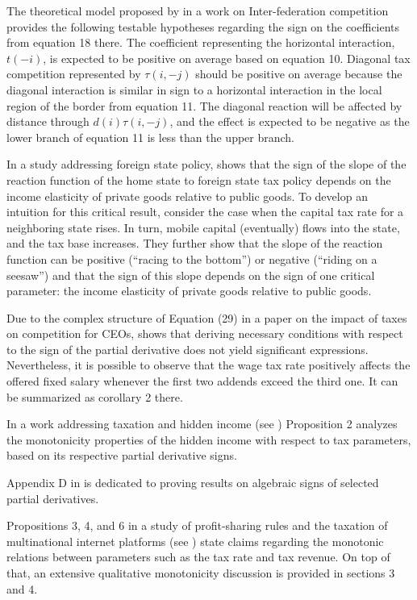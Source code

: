 \documentclass[11pt]{book}
\begin{document}
The theoretical model proposed by \cite{agrawal2015inter} in a work on Inter-federation competition provides the following
testable hypotheses regarding the sign on the coefficients from equation
18 there. The coefficient representing the horizontal interaction,
$t\left(-i\right)$, is expected to be positive on average based on
equation 10. Diagonal tax competition represented by $\tau\left(i,-j\right)$
should be positive on average because the diagonal interaction is
similar in sign to a horizontal interaction in the local region of
the border from equation 11. The diagonal reaction will be affected
by distance through $d\left(i\right)\tau\left(i,-j\right)$, and the
effect is expected to be negative as the lower branch of equation
11 is less than the upper branch.

In a study addressing foreign state policy, \cite{chirinko2017tax} shows that the sign of the slope of the reaction
function of the home state to foreign state tax policy depends on
the income elasticity of private goods relative to public goods. To
develop an intuition for this critical result, consider the case when
the capital tax rate for a neighboring state rises. In turn, mobile
capital (eventually) flows into the state, and the tax base increases.
They further show that the slope of the reaction function can be positive
(``racing to the bottom'') or negative (``riding on a seesaw'')
and that the sign of this slope depends on the sign of one critical
parameter: the income elasticity of private goods relative to public
goods.

Due to the complex structure of Equation (29) in a paper on the impact of taxes on competition for CEOs, \cite{krenn2017impact} shows that deriving necessary conditions with respect to the sign of the partial
derivative does not yield significant expressions. Nevertheless, it
is possible to observe that the wage tax rate positively affects the
offered fixed salary whenever the first two addends exceed the third
one. It can be summarized as corollary 2 there.

In a work addressing taxation and hidden income (see \cite{di2017productivity}) Proposition 2 analyzes the monotonicity
properties of the hidden income with respect to tax parameters, based
on its respective partial derivative signs.

Appendix D in \cite{niemann2019investment} is dedicated to proving
results on algebraic signs of selected partial derivatives.

Propositions 3, 4, and 6 in a study of profit-sharing rules and the taxation of multinational
internet platforms (see \cite{bloch2019profit}) state claims regarding
the monotonic relations between parameters such as the tax rate and
tax revenue. On top of that, an extensive qualitative monotonicity
discussion is provided in sections 3 and 4.
\end{document}
